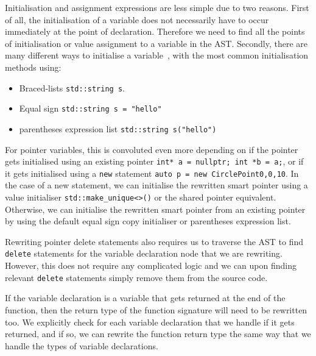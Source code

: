 \documentclass{mpaper}
\begin{document}
    Initialisation and assignment expressions are less simple due to two reasons.
    First of all, the initialisation of a variable does not necessarily have to occur immediately at the point of declaration.
    Therefore we need to find all the points of initialisation or value assignment to a variable in the AST.
    Secondly, there are many different ways to initialise a variable~\cite[p.~196]{C++17}, with the most common initialisation methods using:
    \begin{itemize}
        \item Braced-lists \texttt{std::string s{}}.
        \item Equal sign \texttt{std::string s = "hello"}
        \item parentheses expression list \texttt{std::string s("hello")} 
    \end{itemize}
    For pointer variables, this is convoluted even more depending on if the pointer gets initialised using an existing pointer \texttt{int* a = nullptr; int *b = a;}, or if it gets initialised using a \texttt{new} statement \texttt{auto p = new Circle{Point{0,0},10}}.
    In the case of a new statement, we can initialise the rewritten smart pointer using a value initialiser \texttt{std::make_unique<>()} or the shared pointer equivalent. 
    Otherwise, we can initialise the rewritten smart pointer from an existing pointer by using the default equal sign copy initialiser or parentheses expression list. 
    
    Rewriting pointer delete statements also requires us to traverse the AST to find \texttt{delete} statements for the variable declaration node that we are rewriting.
    However, this does not require any complicated logic and we can upon finding relevant \texttt{delete} statements simply remove them from the source code.
    
    If the variable declaration is a variable that gets returned at the end of the function, then the return type of the function signature will need to be rewritten too. 
    We explicitly check for each variable declaration that we handle if it gets returned, and if so, we can rewrite the function return type the same way that we handle the types of variable declarations.
    
\end{document}
